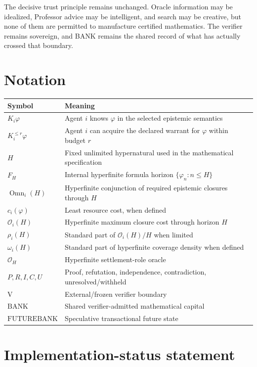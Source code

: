 \documentclass[11pt]{article}
\newcommand{\Omn}{\operatorname{Omn}}
\newcommand{\BANK}{\mathrm{BANK}}
\newcommand{\FBANK}{\mathrm{FUTUREBANK}}
\newcommand{\V}{\mathrm{V}}
\newcommand{\Ocal}{\mathcal{O}}
\begin{document}
The decisive trust principle remains unchanged. Oracle information may be idealized, Professor advice may be intelligent, and search may be creative, but none of them are permitted to manufacture certified mathematics. The verifier remains sovereign, and BANK remains the shared record of what has actually crossed that boundary.

\appendix
\section{Notation}

\begin{center}
\begin{tabular}{p{}p{}}
\toprule
Symbol & Meaning\\
\midrule
$K_i\varphi$ & Agent $i$ knows $\varphi$ in the selected epistemic semantics\\
$K_i^{\le r}\varphi$ & Agent $i$ can acquire the declared warrant for $\varphi$ within budget $r$\\
$H$ & Fixed unlimited hypernatural used in the mathematical specification\\
$F_H$ & Internal hyperfinite formula horizon $\{\varphi_n:n\le H\}$\\
$\Omn_i(H)$ & Hyperfinite conjunction of required epistemic closures through $H$\\
$c_i(\varphi)$ & Least resource cost, when defined\\
$\Ocal_i(H)$ & Hyperfinite maximum closure cost through horizon $H$\\
$\rho_i(H)$ & Standard part of $\Ocal_i(H)/H$ when limited\\
$\omega_i(H)$ & Standard part of hyperfinite coverage density when defined\\
$\mathscr O_H$ & Hyperfinite settlement-role oracle\\
$P,R,I,C,U$ & Proof, refutation, independence, contradiction, unresolved/withheld\\
$\V$ & External/frozen verifier boundary\\
$\BANK$ & Shared verifier-admitted mathematical capital\\
$\FBANK$ & Speculative transactional future state\\
\bottomrule
\end{tabular}
\end{center}

\section{Implementation-status statement}
\end{document}
